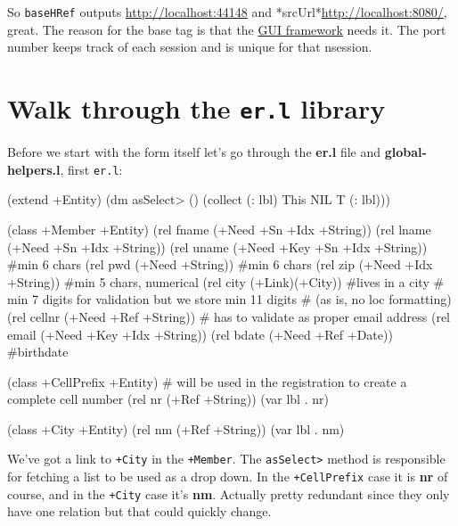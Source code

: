 So \texttt{baseHRef} outputs \href{http://localhost:44148}{http://localhost:44148} and
*srcUrl*\href{http://localhost:8080/}{http://localhost:8080/}, great. The reason for the base tag is
that the \href{http://software-lab.de/app.html}{GUI framework} needs it.
The port number keeps track of each session and is unique for that
nsession.


\section{Walk through the \texttt{er.l} library}
\label{sec:registration-form}

Before we start with the form itself let's go through the
\textbf{er.l} file and \textbf{global-helpers.l}, first \texttt{er.l}:

\begin{wideverbatim}
(extend +Entity)
(dm asSelect> ()
    (collect (: lbl) This NIL T (: lbl)))

(class +Member +Entity)
(rel fname    (+Need +Sn +Idx +String))
(rel lname    (+Need +Sn +Idx +String))
(rel uname    (+Need +Key +Sn +Idx +String))  #min 6 chars
(rel pwd      (+Need +String))                #min 6 chars
(rel zip      (+Need +Idx +String))           #min 5 chars, numerical
(rel city     (+Link)(+City))                 #lives in a city
# min 7 digits for validation but we store min 11 digits 
# (as is, no loc formatting)    
(rel cellnr   (+Need +Ref +String))  
# has to validate as proper email address
(rel email    (+Need +Key +Idx +String))     
(rel bdate    (+Need +Ref +Date))             #birthdate

\end{wideverbatim}

\begin{wideverbatim}

(class +CellPrefix +Entity)
# will be used in the registration to create a complete cell number
(rel nr (+Ref +String))
(var lbl . nr)

(class +City +Entity)
(rel nm (+Ref +String))
(var lbl . nm)
\end{wideverbatim}

We've got a link to \texttt{+City} in the \texttt{+Member}. The
\texttt{asSelect>} method is responsible for fetching a list to be
used as a drop down. In the \texttt{+CellPrefix} case it is
\textbf{nr} of course, and in the \texttt{+City} case it's
\textbf{nm}. Actually pretty redundant since they only have one
relation but that could quickly change.


